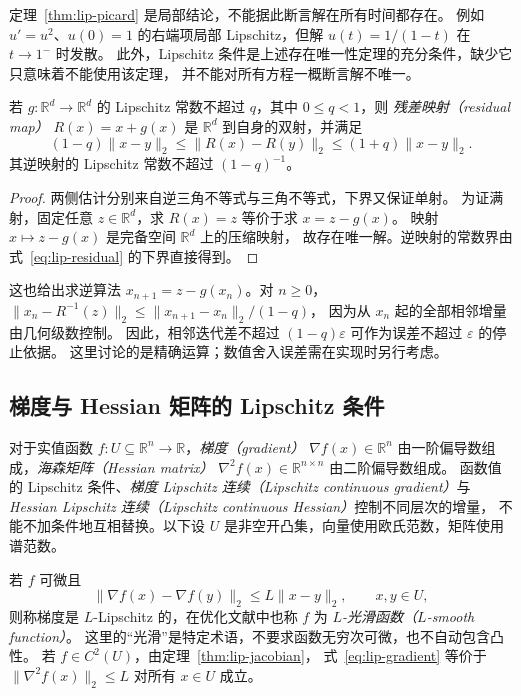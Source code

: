 \documentclass[UTF8,12pt,a4paper,fontset=fandol]{ctexart}
\begin{document}
定理~\ref{thm:lip-picard} 是局部结论，不能据此断言解在所有时间都存在。
例如 $u'=u^2$、$u(0)=1$ 的右端项局部 Lipschitz，但解 $u(t)=1/(1-t)$ 在 $t\to1^-$ 时发散。
此外，Lipschitz 条件是上述存在唯一性定理的充分条件，缺少它只意味着不能使用该定理，
并不能对所有方程一概断言解不唯一。

\begin{proposition}\label{prop:lip-residual}
若 $g:\mathbb R^d\to\mathbb R^d$ 的 Lipschitz 常数不超过 $q$，其中 $0\le q<1$，则
\emph{残差映射（residual map）} $R(x)=x+g(x)$ 是 $\mathbb R^d$ 到自身的双射，并满足
\begin{equation}\label{eq:lip-residual}
  (1-q)\|x-y\|_2\le\|R(x)-R(y)\|_2\le(1+q)\|x-y\|_2.
\end{equation}
其逆映射的 Lipschitz 常数不超过 $(1-q)^{-1}$。
\end{proposition}
\begin{proof}
两侧估计分别来自逆三角不等式与三角不等式，下界又保证单射。
为证满射，固定任意 $z\in\mathbb R^d$，求 $R(x)=z$ 等价于求 $x=z-g(x)$。
映射 $x\mapsto z-g(x)$ 是完备空间 $\mathbb R^d$ 上的压缩映射，
故存在唯一解。逆映射的常数界由式~\eqref{eq:lip-residual} 的下界直接得到。
\end{proof}

这也给出求逆算法 $x_{n+1}=z-g(x_n)$。对 $n\ge0$，
$\|x_n-R^{-1}(z)\|_2\le\|x_{n+1}-x_n\|_2/(1-q)$，
因为从 $x_n$ 起的全部相邻增量由几何级数控制。
因此，相邻迭代差不超过 $(1-q)\varepsilon$ 可作为误差不超过 $\varepsilon$ 的停止依据。
这里讨论的是精确运算；数值舍入误差需在实现时另行考虑。

\subsection{梯度与 Hessian 矩阵的 Lipschitz 条件}
\label{subsec:lip-smooth}

对于实值函数 $f:U\subseteq\mathbb R^n\to\mathbb R$，\emph{梯度（gradient）}
$\nabla f(x)\in\mathbb R^n$ 由一阶偏导数组成，\emph{海森矩阵（Hessian matrix）}
$\nabla^2 f(x)\in\mathbb R^{n\times n}$ 由二阶偏导数组成。
函数值的 Lipschitz 条件、\emph{梯度 Lipschitz 连续（Lipschitz continuous gradient）}与
\emph{Hessian Lipschitz 连续（Lipschitz continuous Hessian）}控制不同层次的增量，
不能不加条件地互相替换。以下设 $U$ 是非空开凸集，向量使用欧氏范数，矩阵使用谱范数。

若 $f$ 可微且
\begin{equation}\label{eq:lip-gradient}
  \|\nabla f(x)-\nabla f(y)\|_2\le L\|x-y\|_2,\qquad x,y\in U,
\end{equation}
则称梯度是 $L$-Lipschitz 的，在优化文献中也称 $f$ 为
\emph{$L$-光滑函数（$L$-smooth function）}。
这里的“光滑”是特定术语，不要求函数无穷次可微，也不自动包含凸性。
若 $f\in C^2(U)$，由定理~\ref{thm:lip-jacobian}，
式~\eqref{eq:lip-gradient} 等价于 $\|\nabla^2f(x)\|_2\le L$ 对所有 $x\in U$ 成立。
\end{document}
